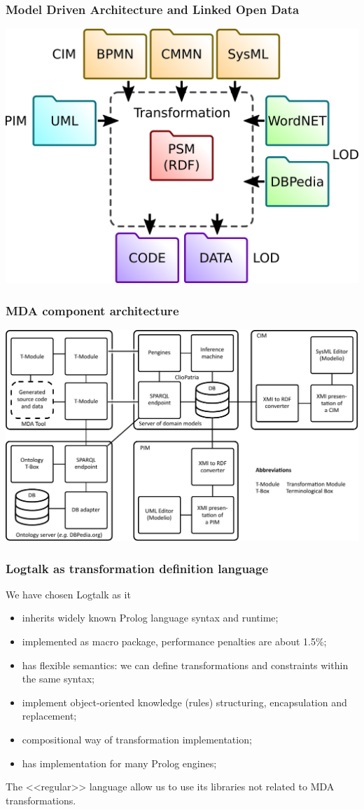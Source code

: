 \documentclass[10pt]{beamer}
\begin{document}
\begin{frame}
  \frametitle{Model Driven Architecture and Linked Open Data}
  \begin{center}
    \includegraphics[width=0.9\linewidth]{mda-overview.pdf}
  \end{center}
\end{frame}
\begin{frame}
  \frametitle{MDA component architecture}
  \centering
  \includegraphics[width=1\linewidth]{architecture-mda-lod-ext.pdf}
\end{frame}
\begin{frame}
  \frametitle{Logtalk as transformation definition language}
  We have chosen Logtalk as it
  \begin{itemize}
  \item inherits widely known Prolog language syntax and runtime;
  \item implemented as macro package, performance penalties are about 1.5\%;
  \item has flexible semantics: we can define transformations and constraints within the same syntax;
  \item implement object-oriented knowledge (rules) structuring, encapsulation and replacement;
  \item compositional way of transformation implementation;
  \item has implementation for many Prolog engines;
  \end{itemize}
  The <<regular>> language allow us to use its libraries not related to MDA transformations.
\end{frame}
\end{document}
